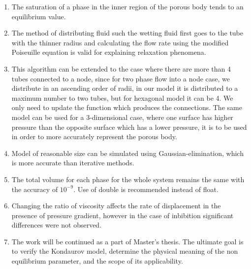 \begin{enumerate}

	\item The saturation of a phase in the inner region of the porous body tends to an equilibrium value.
	
	\item The method of distributing fluid such the wetting fluid first goes to the tube with the thinner radius and calculating the flow rate using the modified Poiseuille equation is valid for explaining relaxation phenomena.

	\item This algorithm can be extended to the case where there are more than 4 tubes connected to a node, since for two phase flow into a node case, we distribute in an ascending order of radii, in our model it is distributed to a maximum number to two tubes, but for hexagonal model it can be 4. We only need to update the function which produces the connections. The same model can be used for a 3-dimensional case, where one surface has higher pressure than the opposite surface which has a lower pressure, it is to be used in order to more accurately represent the porous body.
	
	\item Model of reasonable size can be simulated using Gaussian-elimination, which is more accurate than iterative methods.
	
	\item The total volume for each phase for the whole system remains the same with the accuracy of $10^{-9}$. Use of double is recommended instead of float.
	
	\item Changing the ratio of viscosity affects the rate of displacement in the presence of pressure gradient, however in the case of inbibition significant differences were not observed.

	\item The work will be continued as a part of Master's thesis. The ultimate goal is to verify the Kondaurov model, determine the physical meaning of the non equilibrium parameter, and the scope of its applicability.
\end{enumerate}


